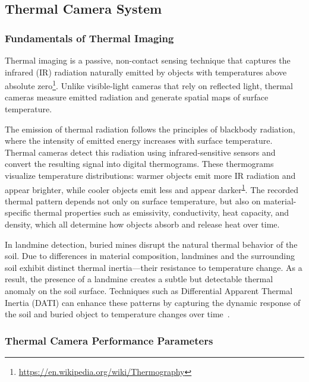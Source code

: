 \subsection{Thermal Camera System}\label{thermal_system}

\subsubsection{Fundamentals of Thermal Imaging}\label{thermal_fundamental}

Thermal imaging is a passive, non-contact sensing technique that captures the infrared (IR) radiation naturally emitted by objects with temperatures above absolute zero\footnote{\label{thermography}\url{https://en.wikipedia.org/wiki/Thermography}}. Unlike visible-light cameras that rely on reflected light, thermal cameras measure emitted radiation and generate spatial maps of surface temperature.

The emission of thermal radiation follows the principles of blackbody radiation, where the intensity of emitted energy increases with surface temperature. Thermal cameras detect this radiation using infrared-sensitive sensors and convert the resulting signal into digital thermograms. These thermograms visualize temperature distributions: warmer objects emit more IR radiation and appear brighter, while cooler objects emit less and appear darker\textsuperscript{\ref{thermography}}. The recorded thermal pattern depends not only on surface temperature, but also on material-specific thermal properties such as emissivity, conductivity, heat capacity, and density, which all determine how objects absorb and release heat over time.

In landmine detection, buried mines disrupt the natural thermal behavior of the soil. Due to differences in material composition, landmines and the surrounding soil exhibit distinct thermal inertia—their resistance to temperature change. As a result, the presence of a landmine creates a subtle but detectable thermal anomaly on the soil surface. Techniques such as Differential Apparent Thermal Inertia (DATI) can enhance these patterns by capturing the dynamic response of the soil and buried object to temperature changes over time~\cite{nikulin2018detection}.



\subsubsection{Thermal Camera Performance Parameters}\label{thermal_parameter}

